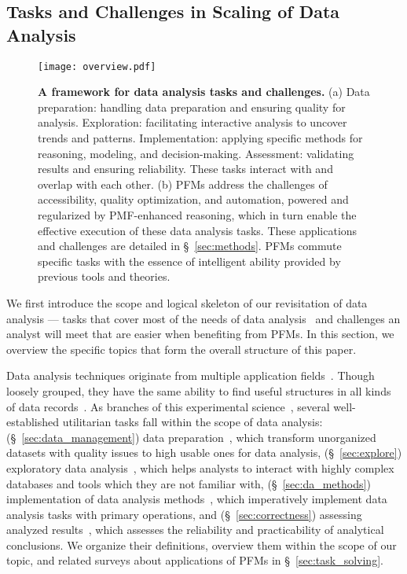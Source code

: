   \subsection{Tasks and Challenges in Scaling of Data Analysis}\label{sec:skeleton}
  
  \begin{figure*}[h] 
    \centering 
    \texttt{[image: overview.pdf]} \label{fig:overview}
  
  \caption{\textbf{A framework for data analysis tasks and challenges.} (a) Data preparation: handling data preparation and ensuring quality for analysis. Exploration: facilitating interactive analysis to uncover trends and patterns. Implementation: applying specific methods for reasoning, modeling, and decision-making. Assessment: validating results and ensuring reliability. These tasks interact with and overlap with each other. (b) PFMs address the challenges of accessibility, quality optimization, and automation, powered and regularized by PMF-enhanced reasoning, which in turn enable the effective execution of these data analysis tasks. These applications and challenges are detailed in \S~\ref{sec:methods}. PFMs commute specific tasks with the essence of intelligent ability provided by previous tools and theories.}
  \end{figure*}
  
  We first introduce the scope and logical skeleton of our revisitation of data analysis — tasks that cover most of the needs of data analysis~\cite{launer2014modern, brandt1976statistical, van2020data,olson2003data, myatt2007making, brooker2020practical} and challenges an analyst will meet that are easier when benefiting from PFMs. In this section, we overview the specific topics that form the overall structure of this paper. 
  
  
  Data analysis techniques originate from multiple application fields~\cite{SPIREX, vertsel2024hybrid,gerussi2022llm,Zhang2024LargeLM,truhn2023large}. Though loosely grouped, they have the same ability to find useful structures in all kinds of data records~\cite{launer2014modern}. As branches of this experimental science~\cite{brandt1976statistical}, several well-established utilitarian tasks fall within the scope of data analysis: (\S~\ref{sec:data_management}) data preparation~\cite{van2020data,olson2003data}, which transform unorganized datasets with quality issues to high usable ones for data analysis, (\S~\ref{sec:explore}) exploratory data analysis~\cite{myatt2007making}, which helps analysts to interact with highly complex databases and tools which they are not familiar with, (\S~\ref{sec:da_methods}) implementation of data analysis methods~\cite{brandt1976statistical,nisbet2009handbook}, which imperatively implement data analysis tasks with primary operations, and (\S~\ref{sec:correctness}) assessing analyzed results~\cite{brooker2020practical,bruce2020practical,kenett2016information}, which assesses the reliability and practicability of analytical conclusions. We organize their definitions, overview them within the scope of our topic, and related surveys about applications of PFMs in \S~\ref{sec:task_solving}.
  
